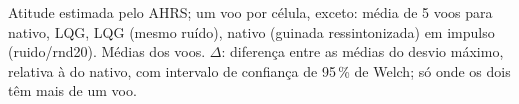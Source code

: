 Atitude estimada pelo AHRS; um voo por célula, exceto: média de 5 voos para nativo, LQG, LQG (mesmo ruído), nativo (guinada ressintonizada) em impulso (ruido/rnd20). Médias dos voos. $\Delta$: diferença entre as médias do desvio máximo, relativa à do nativo, com intervalo de confiança de 95\,\% de Welch; só onde os dois têm mais de um voo.
